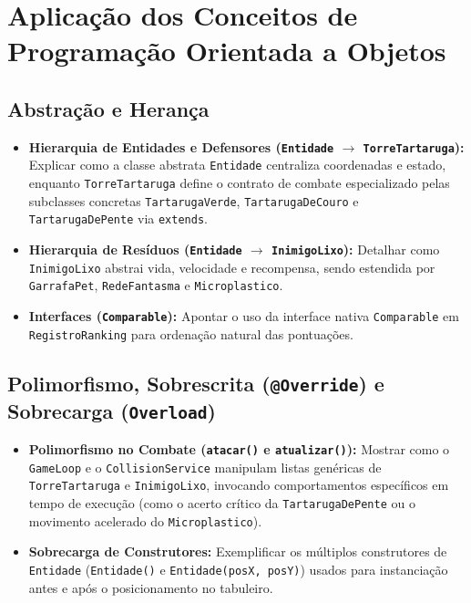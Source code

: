 \documentclass[11pt,a4paper]{article}
\begin{document}
\section{Aplicação dos Conceitos de Programação Orientada a Objetos}

\subsection{Abstração e Herança}
\begin{itemize}
    \item \textbf{Hierarquia de Entidades e Defensores (\texttt{Entidade} $\rightarrow$ \texttt{TorreTartaruga}):} Explicar como a classe abstrata \texttt{Entidade} centraliza coordenadas e estado, enquanto \texttt{TorreTartaruga} define o contrato de combate especializado pelas subclasses concretas \texttt{TartarugaVerde}, \texttt{TartarugaDeCouro} e \texttt{TartarugaDePente} via \texttt{extends}.
    \item \textbf{Hierarquia de Resíduos (\texttt{Entidade} $\rightarrow$ \texttt{InimigoLixo}):} Detalhar como \texttt{InimigoLixo} abstrai vida, velocidade e recompensa, sendo estendida por \texttt{GarrafaPet}, \texttt{RedeFantasma} e \texttt{Microplastico}.
    \item \textbf{Interfaces (\texttt{Comparable}):} Apontar o uso da interface nativa \texttt{Comparable} em \texttt{RegistroRanking} para ordenação natural das pontuações.
\end{itemize}

\subsection{Polimorfismo, Sobrescrita (\texttt{@Override}) e Sobrecarga (\texttt{Overload})}
\begin{itemize}
    \item \textbf{Polimorfismo no Combate (\texttt{atacar()} e \texttt{atualizar()}):} Mostrar como o \texttt{GameLoop} e o \texttt{CollisionService} manipulam listas genéricas de \texttt{TorreTartaruga} e \texttt{InimigoLixo}, invocando comportamentos específicos em tempo de execução (como o acerto crítico da \texttt{TartarugaDePente} ou o movimento acelerado do \texttt{Microplastico}).
    \item \textbf{Sobrecarga de Construtores:} Exemplificar os múltiplos construtores de \texttt{Entidade} (\texttt{Entidade()} e \texttt{Entidade(posX, posY)}) usados para instanciação antes e após o posicionamento no tabuleiro.
\end{itemize}
\end{document}
